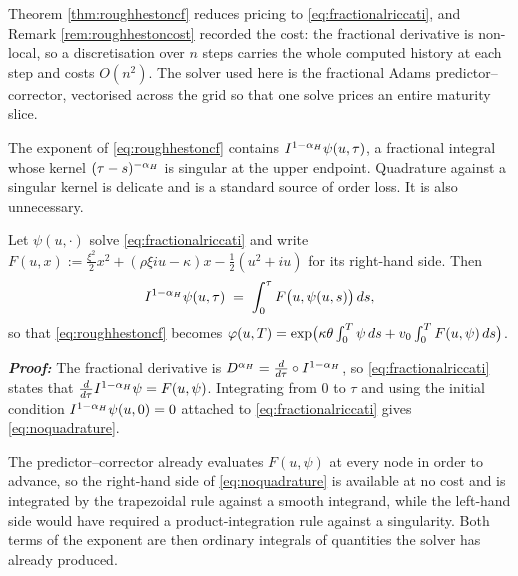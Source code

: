 Theorem \ref{thm:roughhestoncf} reduces pricing to \eqref{eq:fractionalriccati}, and Remark
\ref{rem:roughhestoncost} recorded the cost: the fractional derivative is non-local, so a
discretisation over $n$ steps carries the whole computed history at each step and costs $O(n^{2})$.
The solver used here is the fractional Adams predictor--corrector, vectorised across the grid
so that one solve prices an entire maturity slice. 


The exponent of \eqref{eq:roughhestoncf} contains $I^{1-\alpha_{H}}\psi(u,\tau)$, a fractional
integral whose kernel $(\tau-s)^{-\alpha_{H}}$ is singular at the upper endpoint. Quadrature
against a singular kernel is delicate and is a standard source of order loss. It is also
unnecessary.

\begin{proposition}\label{prop:noquadrature}
Let $\psi(u,\cdot)$ solve \eqref{eq:fractionalriccati} and write
$F(u,x) := \tfrac{\xi^{2}}{2}x^{2}+(\rho\xi iu-\kappa)x-\tfrac12(u^{2}+iu)$ for its right-hand side.
Then
\begin{equation}\label{eq:noquadrature}
  I^{1-\alpha_{H}}\psi(u,\tau)\;=\;\int_{0}^{\tau}F\bigl(u,\psi(u,s)\bigr)\,d s ,
\end{equation}
so that \eqref{eq:roughhestoncf} becomes
$\varphi(u,T)=\exp\bigl(\kappa\theta\int_{0}^{T}\psi\,d s+v_{0}\int_{0}^{T}F(u,\psi)\,d s\bigr)$.
\end{proposition}

\textbf{\textit{Proof:}} The fractional derivative is
$D^{\alpha_{H}}=\frac{d}{d\tau}\circ I^{1-\alpha_{H}}$, so
\eqref{eq:fractionalriccati} states that $\frac{d}{d\tau}I^{1-\alpha_{H}}\psi=F(u,\psi)$.
Integrating from $0$ to $\tau$ and using the initial condition
$I^{1-\alpha_{H}}\psi(u,0)=0$ attached to \eqref{eq:fractionalriccati} gives
\eqref{eq:noquadrature}. \qedfilledtext

\medskip

 The predictor--corrector already evaluates $F(u,\psi)$ at every
node in order to advance, so the right-hand side of \eqref{eq:noquadrature} is available at no cost
and is integrated by the trapezoidal rule against a smooth integrand, while the left-hand side would
have required a product-integration rule against a singularity. Both terms of the exponent are then
ordinary integrals of quantities the solver has already produced.

